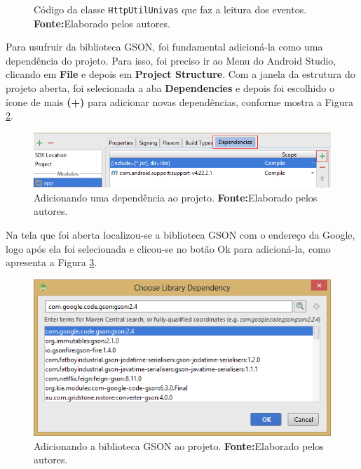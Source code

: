 	\begin{figure}[h!] 
		
		\caption[Código da classe HttpUtilUnivas que faz a leitura dos
		eventos]{Código da classe \texttt{HttpUtilUnivas} que faz a leitura dos
		eventos.
		\textbf{Fonte:}Elaborado pelos autores.}
		\label{fig:app8}
	\end{figure}
	
	\pagebreak
	
	\par Para usufruir da biblioteca GSON, foi fundamental adicioná-la como uma
dependência do projeto. Para isso, foi preciso ir ao Menu do Android Studio,
clicando em \textbf{File} e depois em \textbf{Project Structure}. Com a janela
da estrutura do projeto aberta, foi selecionada a aba \textbf{Dependencies} e
depois foi escolhido o ícone de mais \textbf{(+)} para adicionar novas
dependências, conforme mostra a Figura \ref{fig:app9}.
	
	\begin{figure}[h!] 
		\centerline{\includegraphics[scale=0.7]{./imagens/2_q_metodologico/4_procedimentos_resultados/42_aplicativo/app8.png}}
		\caption[Adicionando uma dependência ao projeto]{Adicionando uma dependência ao projeto.
		\textbf{Fonte:}Elaborado pelos autores.}
		\label{fig:app9}
	\end{figure}
	
	\par Na tela que foi aberta localizou-se a biblioteca GSON com o endereço da
Google, logo após ela foi selecionada e clicou-se no botão Ok para adicioná-la,
como apresenta a Figura \ref{fig:app10}.
	
	\begin{figure}[h!] 
		\centerline{\includegraphics[scale=0.7]{./imagens/2_q_metodologico/4_procedimentos_resultados/42_aplicativo/app9.png}}
		\caption[Adicionando a biblioteca GSON ao projeto]{Adicionando a biblioteca GSON ao projeto.
		\textbf{Fonte:}Elaborado pelos autores.}
		\label{fig:app10}
	\end{figure}
	
